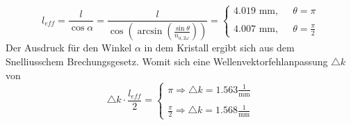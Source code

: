 \begin{equation}
l_{eff}=\frac{l}{\cos\alpha}=\frac{l}{\cos\left(\arcsin\left(\frac{\sin\theta}{n_{a,2\omega}}\right)\right)}=\left\{\begin{array}{ll} 4.019\text{ mm},  \;\; &\theta=\pi\\\\
4.007\text{ mm}, &\theta = \frac{\pi}{2}\end{array}\right.
\end{equation}
Der Ausdruck für den Winkel $\alpha$ in dem Kristall ergibt sich aus dem Snelliusschem Brechungsgesetz.\newline
Womit sich eine Wellenvektorfehlanpassung $\triangle k$ von 
\begin{equation}
\triangle k\cdot \frac{l_{eff}}{2}=\left\{\begin{array}{ll} \pi \Longrightarrow \triangle k=1.563\frac{1}{\text{mm}} \\\\
\frac{\pi}{2}\Longrightarrow \triangle k=1.568\frac{1}{\text{mm}}  \end{array}\right.
\end{equation}
